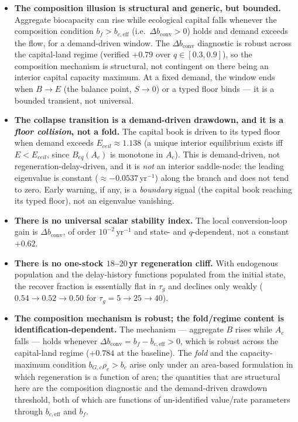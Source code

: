 \documentclass[11pt]{article}
\begin{document}
\begin{itemize}
\item \textbf{The composition illusion is structural and generic, but bounded.} Aggregate biocapacity can rise while ecological capital falls whenever the composition condition $b_f>b_{c,\mathrm{eff}}$ (i.e.\ $\Delta b_{\mathrm{conv}}>0$) holds and demand exceeds the flow, for a demand-driven window. The $\Delta b_{\mathrm{conv}}$ diagnostic is robust across the capital-land regime (verified $+0.79$ over $q\in[0.3,0.9]$), so the composition mechanism is structural, not contingent on there being an interior capital capacity maximum. At a fixed demand, the window ends when $B\to E$ (the balance point, $S\to0$) or a typed floor binds --- it is a bounded transient, not universal.
\item \textbf{The collapse transition is a demand-driven drawdown, and it is a \emph{floor collision}, not a fold.} The capital book is driven to its typed floor when demand exceeds $E_{ceil}\approx1.138$ (a unique interior equilibrium exists iff $E<E_{ceil}$, since $B_{eq}(A_c)$ is monotone in $A_c$). This is demand-driven, not regeneration-delay-driven, and it is \emph{not} an interior saddle-node: the leading eigenvalue is constant ($\approx-0.0537\,\text{yr}^{-1}$) along the branch and does not tend to zero. Early warning, if any, is a \emph{boundary} signal (the capital book reaching its typed floor), not an eigenvalue vanishing.
\item \textbf{There is no universal scalar stability index.} The local conversion-loop gain is $\Delta b_{\mathrm{conv}}$, of order $10^{-2}\,\text{yr}^{-1}$ and state- and $q$-dependent, not a constant $+0.62$.
\item \textbf{There is no one-stock $18$--$20$\,yr regeneration cliff.} With endogenous population and the delay-history functions populated from the initial state, the recover fraction is essentially flat in $\tau_g$ and declines only weakly ($0.54\to0.52\to0.50$ for $\tau_g=5\to25\to40$).
\item \textbf{The composition mechanism is robust; the fold/regime content is identification-dependent.} The mechanism --- aggregate $B$ rises while $A_c$ falls --- holds whenever $\Delta b_{\mathrm{conv}}=b_f-b_{c,\mathrm{eff}}>0$, which is robust across the capital-land regime ($+0.784$ at the baseline). The \emph{fold} and the capacity-maximum condition $b_{G,c}\rho_c>b_c$ arise only under an area-based formulation in which regeneration is a function of area; the quantities that are structural here are the composition diagnostic and the demand-driven drawdown threshold, both of which are functions of un-identified value/rate parameters through $b_{c,\mathrm{eff}}$ and $b_f$.

\end{itemize}
\end{document}
